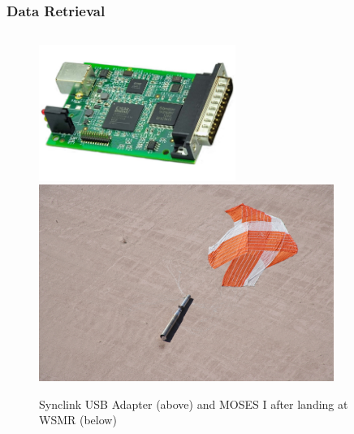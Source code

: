\documentclass[landscape,xcolor={table},10pt]{beamer}
\begin{document}
	\begin{frame}
		
		\frametitle{Data Retrieval}
		
		\begin{columns}[T] %
		\begin{column}{.49\textwidth}
			\begin{figure}
				\centering
				\includegraphics[width=0.6\textwidth]{images/synclink}\\
				\includegraphics[width=0.9\textwidth]{images/desert}
				\caption{Synclink USB Adapter (above) and MOSES I after landing at WSMR (below)}
			\end{figure}
			
		\end{column}%
		\hfill%
		\begin{column}{.49\textwidth}


\end{column}
\end{columns}
\end{frame}
\end{document}
